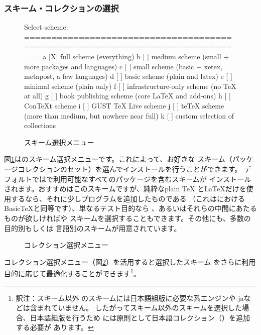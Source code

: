 \documentclass[uplatex,dvipdfmx,12pt,tombow]{jsarticle}
\begin{document}
\subsubsection{スキーム・コレクションの選択}
\label{sec:components}

\begin{figure}[tbh]
\begin{boxedverbatim}
Select scheme:
===============================================================================
 a [X] full scheme (everything)
 b [ ] medium scheme (small + more packages and languages)
 c [ ] small scheme (basic + xetex, metapost, a few languages)
 d [ ] basic scheme (plain and latex)
 e [ ] minimal scheme (plain only)
 f [ ] infrastructure-only scheme (no TeX at all)
 g [ ] book publishing scheme (core LaTeX and add-ons)
 h [ ] ConTeXt scheme
 i [ ] GUST TeX Live scheme
 j [ ] teTeX scheme (more than medium, but nowhere near full)
 k [ ] custom selection of collections
\end{boxedverbatim}
\vspace{-1zh}
\caption{スキーム選択メニュー}\label{fig:scheme-text}
\end{figure}

図\ref{fig:scheme-text}は\TL のスキーム選択メニューです。これによって、お好きな
スキーム（パッケージコレクションのセット）を選んでインストールを行うことができます。
デフォルトでは\TL で利用可能なすべてのパッケージを含むスキームが
インストールされます。おすすめはこのスキームですが、純粋なplain \TeX
と\LaTeX だけを使用するなら、それに少しプログラムを追加したものである
（これは\MacTeX におけるBasic\TeX と同等です）、単なるテスト目的なら
、あるいはそれらの中間にあたるものが欲しければや
スキームを選択することもできます。その他にも、多数の目的別もしくは
言語別のスキームが用意されています。

\begin{figure}[tb]
\centering {}
\caption{コレクション選択メニュー}\label{fig:collections-gui}
\end{figure}

コレクション選択メニュー（図\ref{fig:collections-gui}）を活用すると選択したスキーム
をさらに利用目的に応じて最適化することができます\footnote{訳注：スキーム以外
のスキームには日本語組版に必要な\pTeX 系エンジンや\LuaTeX-jaなどは含まれていません。
したがってスキーム以外のスキームを選択した場合、日本語組版を行うため
には原則として日本語コレクション（）を追加する必要が
あります。}。
\end{document}
